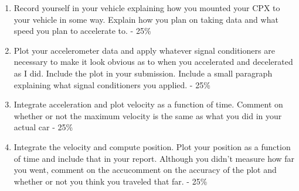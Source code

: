 \begin{enumerate}[itemsep=-5pt]
\item Record yourself in your vehicle explaining how you mounted your CPX to your vehicle in some way. Explain how you plan on taking data and what speed you plan to accelerate to. - 25\%
\item Plot your accelerometer data and apply whatever signal conditioners are necessary to make it look obvious as to when you accelerated and decelerated as I did. Include the plot in your submission. Include a small paragraph explaining what signal conditioners you applied. - 25\%
\item Integrate acceleration and plot velocity as a function of time. Comment on whether or not the maximum velocity is the same as what you did in your actual car - 25\%
\item Integrate the velocity and compute position. Plot your position as a function of time and include that in your report. Although you didn't measure how far you went, comment on the accucomment on the accuracy of the plot and whether or not you think you traveled that far. - 25\%
\end{enumerate}
